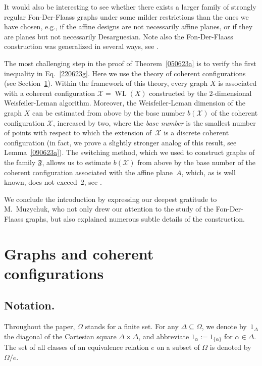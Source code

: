 \documentclass{amsart}
\newcommand{\cal}{\mathcal}
\def\cX{{\cal X}}
\def\fF{{\mathfrak F}}
\DeclareMathOperator{\WL}{WL}
\begin{document}
It would also be interesting to see whether there exists a larger family of strongly regular Fon-Der-Flaass graphs under some milder 
restrictions than the ones we have chosen, e.g., if the affine designs are not necessarily affine planes, or if they are planes but not necessarily Desarguesian. Note also the Fon-Der-Flaass construction  
was generalized in several ways, see \cite{Muzychuk2009F,VVK}.
\smallskip

The most challenging step in the proof of Theorem~\ref{050623a} is to verify the first inequality in Eq.~\eqref{220623g}. Here we use the theory of coherent configurations (see Section~\ref{240623a}). Within the framework of this theory, every graph $X$ is associated with a  coherent configuration $\cX=\WL(X)$ constructed by the $2$-dimensional Weisfeiler-Leman algorithm. Moreover, the Weisfeiler-Leman dimension of the graph $X$ can be estimated from above by the base number $b(\cX)$ of the coherent configuration $\cX$, increased by two, where the \emph{base number} is the smallest number of points with respect to which the extension of~$\cX$ is a discrete coherent configuration (in fact, we prove a slightly stronger analog of this result, see Lemma~\ref{090623a}). The switching method, which we used to construct graphs of the family $\fF$, allows us to estimate $b(\cX)$ from above by the base number of the coherent configuration associated with the affine plane~$A$, which, as is well known, does not exceed~$2$, see \cite[Theorem~3.3.8]{CP2019}.~
\smallskip

We conclude the introduction by expressing 
our deepest gratitude to M.~Muzychuk, who not only drew our attention to the study of the Fon-Der-Flaass graphs, but also explained numerous subtle details of the construction.

\section{Graphs and coherent configurations}\label{240623a}

\subsection{Notation.}
Throughout the paper, $\Omega$ stands for a finite set. For any $\Delta\subseteq \Omega$, we denote by~$1_\Delta$ the diagonal of the Cartesian square $\Delta\times\Delta$, and abbreviate $1_\alpha:=1_{\{\alpha\}}$ for $\alpha\in\Delta$. The set of all classes
of an equivalence relation $e$  on a subset of $\Omega$ is  denoted by $\Omega/e$.
\end{document}
